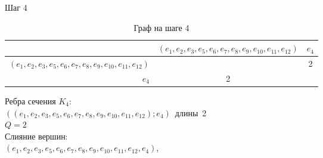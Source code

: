 \documentclass[a4paper,12pt]{article}
\begin{document}
\bigskip
\noindent
\begin{minipage}{\textwidth}
Шаг 4\\
\begin{table}[H]
\centering
\caption{Граф на шаге 4}
\begin{tabular}{r*{2}{|c}}
&$(e_{1},e_{2},e_{3},e_{5},e_{6},e_{7},e_{8},e_{9},e_{10},e_{11},e_{12})$&$e_{4}$\\
\hline $(e_{1},e_{2},e_{3},e_{5},e_{6},e_{7},e_{8},e_{9},e_{10},e_{11},e_{12})$&&2\\
\hline $e_{4}$&2&\\
\end{tabular}
\end{table}
Ребра сечения $K_{4}$:\\
\mbox{$((e_{1},e_{2},e_{3},e_{5},e_{6},e_{7},e_{8},e_{9},e_{10},e_{11},e_{12});e_{4})$ длины 2}\\
$Q=2$\\
Слияние вершин:\\
\mbox{$(e_{1},e_{2},e_{3},e_{5},e_{6},e_{7},e_{8},e_{9},e_{10},e_{11},e_{12},e_{4})$},
\end{minipage}

\label{LastPage}
\end{document}
